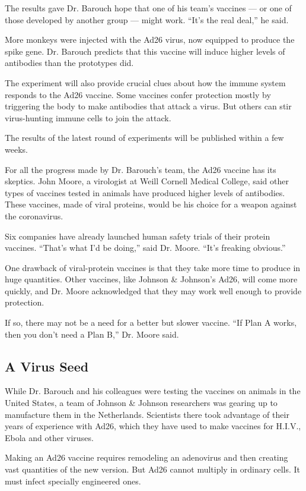 The results gave Dr. Barouch hope that one of his team's vaccines --- or
one of those developed by another group --- might work. ``It's the real
deal,'' he said.

More monkeys were injected with the Ad26 virus, now equipped to produce
the spike gene. Dr. Barouch predicts that this vaccine will induce
higher levels of antibodies than the prototypes did.

The experiment will also provide crucial clues about how the immune
system responds to the Ad26 vaccine. Some vaccines confer protection
mostly by triggering the body to make antibodies that attack a virus.
But others can stir virus-hunting immune cells to join the attack.

The results of the latest round of experiments will be published within
a few weeks.

For all the progress made by Dr. Barouch's team, the Ad26 vaccine has
its skeptics. John Moore, a virologist at Weill Cornell Medical College,
said other types of vaccines tested in animals have produced higher
levels of antibodies. These vaccines, made of viral proteins, would be
his choice for a weapon against the coronavirus.

Six companies have already launched human safety trials of their protein
vaccines. ``That's what I'd be doing,'' said Dr. Moore. ``It's freaking
obvious.''

One drawback of viral-protein vaccines is that they take more time to
produce in huge quantities. Other vaccines, like Johnson \& Johnson's
Ad26, will come more quickly, and Dr. Moore acknowledged that they may
work well enough to provide protection.

If so, there may not be a need for a better but slower vaccine. ``If
Plan A works, then you don't need a Plan B,'' Dr. Moore said.

\hypertarget{a-virus-seed}{%
\subsection{A Virus Seed}\label{a-virus-seed}}

While Dr. Barouch and his colleagues were testing the vaccines on
animals in the United States, a team of Johnson \& Johnson researchers
was gearing up to manufacture them in the Netherlands. Scientists there
took advantage of their years of experience with Ad26, which they have
used to make vaccines for H.I.V., Ebola and other viruses.

Making an Ad26 vaccine requires remodeling an adenovirus and then
creating vast quantities of the new version. But Ad26 cannot multiply in
ordinary cells. It must infect specially engineered ones.

